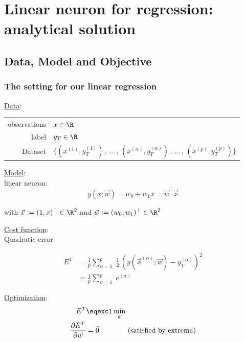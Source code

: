 \section{Linear neuron for regression: analytical solution}

\subsection{Data, Model and Objective}

\begin{frame}\frametitle{The setting for our linear regression}

\underline{Data}:\\

\begin{table}[h]
\begin{tabular}{rl}
observations & $x \in \R$ \\
label         & $y_{T} \in \R$ \\
Dataset       & 
$
\Big\{
	\left(x^{(1)}, y_T^{(1)} 
	\right)
	\,,\, \ldots \,,\,
	\left( x^{(\alpha)}, y_T^{(\alpha)} \right)
	\,,\, \ldots \,,\, 
	\left( x^{(p)}, y_T^{(p)} \right) 
\Big\}
$
\end{tabular}
\end{table}

\underline{Model}:\\

linear neuron:
\begin{equation}
    y(x; \vec w) = w_{0} + w_{1} x = \vec w^{\top} \vec x
\end{equation}

with $\vec x := (1, x)^{\top} \in \R^{2}$ and $\vec w := (w_{0}, w_{1})^{\top} \in \R^{2}$

\end{frame}

\begin{frame}

\underline{Cost function}:\\

Quadratic error

\begin{align}
E^{T} &= \frac{1}{p} \sum_{\alpha=1}^{p} \;
\frac{1}{2} \, \left( y(\vec x^{(\alpha)}; \vec w)- y^{(\alpha)}_{T}\right)^{2}\\
&= \frac{1}{p} \sum_{\alpha=1}^{p}
\;e^{(\alpha)}
\end{align}


\pause

\underline{Optimization}:\\

\begin{align}
E^{T} &\eqexcl \min_{\vec w}\\
\frac{\partial E^{T}}{\partial \vec w} &= \vec 0 \qquad\qquad \text{(satisfied by extrema)}
\label{eq:extremacond}
\end{align}
    
\end{frame}

